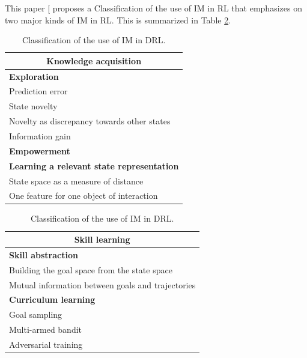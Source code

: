 \documentclass[conference]{IEEEtran}
\begin{document}
This paper [\cite{aubret2019survey} proposes a Classification of the use of IM in RL that emphasizes on two major kinds of IM in RL. This is summarized in Table \ref{tab:classification}.
\begin{table}[h]
  \centering
  \begin{subtable}[t]{0.45\columnwidth}
    \centering
    \begin{tabular}{|p{}|}
      \hline
      \multicolumn{1}{|c|}{\textbf{Knowledge acquisition}} \\
      \hline
      \hline
      \textbf{Exploration} \\
      \hline
      Prediction error \\
      State novelty \\
      Novelty as discrepancy towards other states \\
      Information gain \\
      \hline
      \hline
      \textbf{Empowerment} \\
      \hline
      \hline
      \textbf{Learning a relevant state representation} \\
      \hline
      State space as a measure of distance \\
      One feature for one object of interaction \\
      \hline
    \end{tabular}
  \end{subtable}
  \hspace{0em}
  \begin{subtable}[t]{0.45\columnwidth}
    \centering
    \begin{tabular}{|p{}|}
      \hline
      \multicolumn{1}{|c|}{\textbf{Skill learning}} \\
      \hline
      \hline
      \textbf{Skill abstraction} \\
      \hline
      Building the goal space from the state space \\
      Mutual information between goals and trajectories \\
      \hline
      \hline
      \textbf{Curriculum learning} \\
      \hline
      Goal sampling \\
      Multi-armed bandit \\
      Adversarial training \\
      \hline
    \end{tabular}
  \end{subtable}
  \caption{Classification of the use of IM in DRL.}
  \label{tab:classification}
\end{table}
\end{document}
